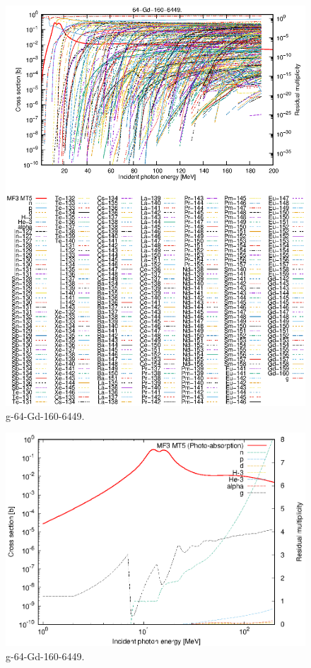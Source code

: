 \begin{figure}
 \includegraphics[width=\linewidth]{eps/g_64-Gd-160_6449.eps}
  \caption{g-64-Gd-160-6449.}
\end{figure}
\newpage \clearpage

\begin{figure}
 \includegraphics[width=\linewidth]{eps-log/g_64-Gd-160_6449.eps}
 \caption{g-64-Gd-160-6449.}
\end{figure}
\newpage \clearpage

